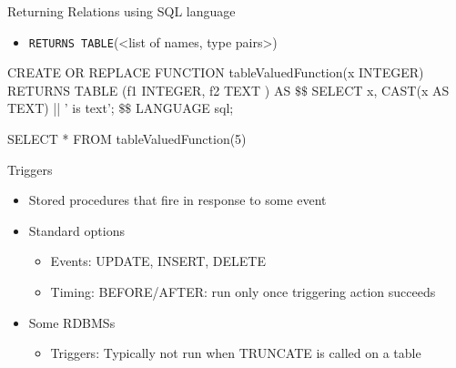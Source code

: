 \documentclass[aspectratio=169]{beamer}
\newenvironment{noindentitemize}
{ \begin{itemize}
 \setlength{\itemsep}{1.5ex}
  \setlength{\parsep}{0pt}   
  \setlength{\parskip}{0pt}
 \addtolength{\leftskip}{-2em}
 }
{ \end{itemize} }
\newenvironment{noindentitemize2}
{ \begin{itemize}
  \setlength{\itemsep}{0ex}
  \setlength{\parskip}{0pt}
  \setlength{\parsep}{0pt}   
  \addtolength{\leftskip}{-2em}  }
{ \end{itemize} }
\begin{document}
\begin{frame}[fragile]{Returning Relations using SQL language}

\begin{noindentitemize}
	\item \texttt{RETURNS TABLE}(<list of names, type pairs>)
\end{noindentitemize}

\begin{SQL}
CREATE OR REPLACE FUNCTION  
   tableValuedFunction(x INTEGER)
   RETURNS TABLE (f1 INTEGER, f2 TEXT )
AS
$\textbf{\$\$}$
  SELECT x, CAST(x AS TEXT) || ' is text';
$\textbf{\$\$}$
LANGUAGE sql;


SELECT * FROM tableValuedFunction(5)
\end{SQL}

\end{frame}


\begin{frame}{Triggers}
\begin{noindentitemize}
	\item Stored procedures that fire in response to some event
	\item Standard options
\begin{noindentitemize2}
	\item Events: UPDATE, INSERT, DELETE
	\item Timing: BEFORE/AFTER: run only once triggering action succeeds
\end{noindentitemize2}
\item Some RDBMSs
\begin{noindentitemize2}
\item Triggers: Typically not run when TRUNCATE is called on a table
\end{noindentitemize2}
\end{noindentitemize}

\end{frame}
\end{document}
